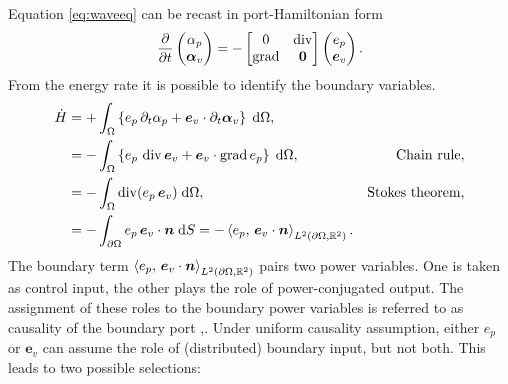 Equation \eqref{eq:waveeq} can be recast in port-Hamiltonian form
\begin{equation}\label{eq:pHsys_waves}
\diffp{}{t}
\begin{pmatrix}
\alpha_p \\
\bm{\alpha}_v \\
\end{pmatrix} = 
-\begin{bmatrix}
0 & \div \\
\grad & \bm{0}
\end{bmatrix}
\begin{pmatrix}
e_p \\
\bm{e}_v \\
\end{pmatrix}.
\end{equation}
From the energy rate it is possible to identify the boundary variables. 
\begin{align*}
\dot{H} &= +\int_{\Omega} \left\{ e_p \, \partial_t \alpha_p + \bm{e}_v \cdot \partial_t \bm{\alpha}_v\right\} \d\Omega, \\
 &= -\int_{\Omega} \left\{e_p \, \div \bm{e}_v + \bm{e}_v \cdot \grad e_p \right\}\d\Omega, \qquad &\text{Chain rule}, \\
 &= -\int_{\Omega} \div(e_p \, \bm{e}_v) \d\Omega, \qquad &\text{Stokes theorem}, \\
 &= -\int_{\partial \Omega} e_p \, \bm{e}_v\cdot\bm{n} \d{S} = -\inner[L^2(\partial\Omega, \bbR^2)]{e_p}{\bm{e}_v \cdot\bm{n}}.
\end{align*}
The boundary term $\inner[L^2(\partial\Omega, \bbR^2)]{e_p}{\bm{e}_v\cdot\bm{n}}$ pairs two power variables. One is taken as control input, the other plays the role of power-conjugated output. The assignment of these roles to the boundary power variables is referred to as causality of the boundary port \cite{kotyczka2018weak},\cite[Chapter~2]{kotyczka2019numerical}. Under uniform causality assumption, either $e_p$ or $\bm{e}_v$ can assume the role of (distributed) boundary input, but not both. This leads to two possible selections:
